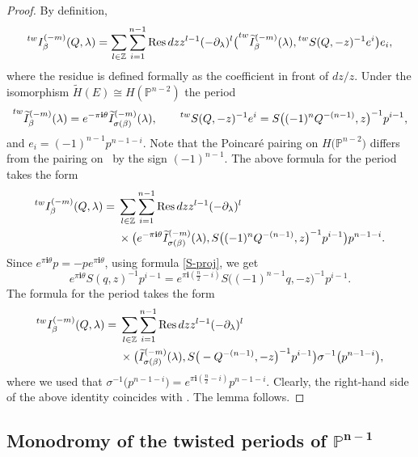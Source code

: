 \documentclass[pdftex]{sigma}
\numberwithin{equation}{section}
\newcommand{\leftexp}[2]{{\vphantom{#2}}^{#1}{#2}}
\newcommand{\ZZ}{\mathbb{Z}}
\newcommand{\PP}{\mathbb{P}}
\newcommand{\ii}{\mathbf{i}}
\begin{document}
\begin{proof}
By definition,
\[
\leftexp{tw}{I}^{(-m)}_\beta(Q,\lambda) =
\sum_{l\in \ZZ} \sum_{i=1}^{n-1}
\operatorname{Res} dz z^{l-1} (-\partial_\lambda)^l
\big(
\leftexp{tw}{\widetilde{I}}^{(-m)}_\beta(\lambda),
\leftexp{tw}{S}(Q,-z)^{-1} e^i
\big) e_i,
\]
where the residue is defined formally as the coefficient in front of
$dz/z$. Under the isomorphism $\widetilde{H}(E)\cong H(\PP^{n-2})$ the
period
\begin{gather*}
\leftexp{tw}{\widetilde{I}}^{(-m)}_\beta(\lambda) =
e^{-\pi \ii \theta} \widetilde{I}^{(-m)}_{\sigma(\beta)}(\lambda),
\qquad
\leftexp{tw}{S}(Q,-z)^{-1} e^i = S\big((-1)^n Q^{-(n-1)}, z\big)^{-1} p^{i-1},
\end{gather*}
and $e_i= (-1)^{n-1} p^{n-1-i}$. Note that the Poincar\'e pairing on
$H\big(\PP^{n-2}\big)$ differs from the pairing on~ by the
sign $(-1)^{n-1}$. The above formula for the period takes the form
\begin{align*}
\leftexp{tw}{I}^{(-m)}_\beta(Q,\lambda) ={}&
\sum_{l\in \ZZ} \sum_{i=1}^{n-1}
\operatorname{Res} dz z^{l-1} (-\partial_\lambda)^l\\
&\times
\big(
 e^{-\pi \ii \theta} \widetilde{I}^{(-m)}_{\sigma(\beta)}(\lambda),
S\big((-1)^n Q^{-(n-1)}, z\big)^{-1} p^{i-1}
\big) p^{n-1-i}.
\end{align*}
Since $e^{\pi \ii \theta} p =-p e^{\pi\ii\theta}$, using formula
\eqref{S-proj}, we get
\[
e^{\pi\ii\theta} S(q,z)^{-1} p^{i-1} =
e^{\pi\ii (\frac{n}{2}-i )}
S\big((-1)^{n-1}q,-z\big)^{-1} p^{i-1}.
\]
The formula for the period takes the form
\begin{align*}
\leftexp{tw}{I}^{(-m)}_\beta(Q,\lambda) ={}&
\sum_{l\in \ZZ} \sum_{i=1}^{n-1}
\operatorname{Res} dz z^{l-1} (-\partial_\lambda)^l\\&\times
\big(
\widetilde{I}^{(-m)}_{\sigma(\beta)}(\lambda),
S\big(-Q^{-(n-1)}, -z\big)^{-1} p^{i-1}
\big) \sigma^{-1}\big(p^{n-1-i}\big),
\end{align*}
where we used that
$
\sigma^{-1}\big(p^{n-1-i}\big)=
e^{\pi\ii (\frac{n}{2}-i )} p^{n-1-i}.
$
Clearly, the right-hand side of the above identity coincides with
. The
lemma follows.
\end{proof}

\subsection[Monodromy of the twisted periods of P\^\{n-1\}]{Monodromy of the twisted periods of $\boldsymbol{\PP^{n-1}}$}
\end{document}
